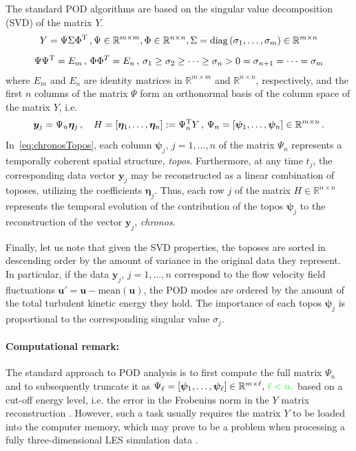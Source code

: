 The standard POD algorithms are based on the singular value decomposition (SVD) of the matrix $Y$. 
\begin{equation}
\label{eq:svdY}
\begin{array}{*1{>{\displaystyle}c}}
    Y = \Psi \Sigma \Phi^{\transp}\,,\Psi \in \mathbb{R}^{m\times m}, \Phi\in\mathbb{R}^{n\times n}, \Sigma = \mathrm{diag}\,(\sigma_{1},\dots,\sigma_{m}) \in \mathbb{R}^{m\times n}\\[0.3cm]
    \Psi\Psi^{\transp} = E_{m}\,,\,\Phi\Phi^{T} = E_{n}\,,\,\sigma_{1}\geq\sigma_{2}\geq\dots\geq\sigma_{n} > 0 = \sigma_{n+1} = \dots = \sigma_{m}
\end{array}    
\end{equation}
where $E_{m}$ and $E_{n}$ are identity matrices in $\mathbb{R}^{m\times m}$ and $\mathbb{R}^{n\times n}$, respectively, and the first $n$ columns of the matrix $\Psi$ form an orthonormal basis of the column space of the matrix $Y$, i.e.
\begin{equation}
\label{eq:chronosTopos}
    \bm{y}_{j} = \Psi_{n}\bm{\eta}_{j}\,,\quad H = \left[\bm{\eta}_{1},\dots,\bm{\eta}_{n}\right]:= \Psi_{n}^{\mathrm{T}} Y\,,\,\Psi_{n} = \left[\bm{\psi}_{1},\dots,\bm{\psi}_{n} \right]\in\mathbb{R}^{m\times n}\,.
\end{equation}
In~\eqref{eq:chronosTopos}, each column $\bm{\psi}_{j},\,j=1,\dots,n$ of the matrix $\Psi_{n}$ represents a temporally coherent spatial structure, \textit{topos}. Furthermore, at any time $t_{j}$, the corresponding data vector $\bm{y}_{j}$ may be reconstructed as a linear combination of toposes, utilizing the coefficients $\bm{\eta}_{j}$. Thus, each row $j$ of the matrix $H\in\mathbb{R}^{n\times n}$ represents the temporal evolution of the contribution of the topos $\bm{\psi}_{j}$ to the reconstruction of the vector $\bm{y}_{j}$, \textit{chronos}.

Finally, let us note that given the SVD properties, the toposes are sorted in descending order by the amount of variance in the original data they represent. In particular, if the data $\bm{y}_{j},\,j=1,\dots,n$ correspond to the flow velocity field fluctuations $\bm{u}' = \bm{u} - \mathrm{mean}(\bm{u})$, the POD modes are ordered by the amount of the total turbulent kinetic energy they hold. The importance of each topos $\bm{\psi}_{j}$ is proportional to the corresponding singular value $\sigma_{j}$.

\paragraph{Computational remark:} The standard approach to POD analysis is to first compute the full matrix $\Psi_{n}$ and to subsequently truncate {it} as $\Psi_{\ell} = [\bm{\psi}_{1},\dots,\bm{\psi}_{\ell}]\in\mathbb{R}^{m\times \ell},\,\textcolor{green}{\ell < n,}$ based on a cut-off energy level, i.e. the error in the Frobenius norm in the $Y$ matrix reconstruction \citep{isoz2019,volkwein2013}.  However, such a task usually requires the matrix $Y$ to be loaded into the computer memory, which may prove {to be} a problem when processing a fully three-dimensional LES simulation data \citep{kabir2017}.

